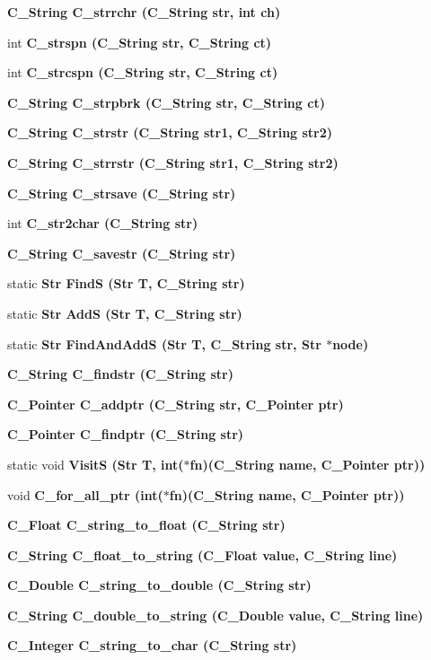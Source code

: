 \begin{CompactItemize}
\bf{C\_\-String} \bf{C\_\-strrchr} (\bf{C\_\-String} str, int ch)
\item 
int \bf{C\_\-strspn} (\bf{C\_\-String} str, \bf{C\_\-String} ct)
\item 
int \bf{C\_\-strcspn} (\bf{C\_\-String} str, \bf{C\_\-String} ct)
\item 
\bf{C\_\-String} \bf{C\_\-strpbrk} (\bf{C\_\-String} str, \bf{C\_\-String} ct)
\item 
\bf{C\_\-String} \bf{C\_\-strstr} (\bf{C\_\-String} str1, \bf{C\_\-String} str2)
\item 
\bf{C\_\-String} \bf{C\_\-strrstr} (\bf{C\_\-String} str1, \bf{C\_\-String} str2)
\item 
\bf{C\_\-String} \bf{C\_\-strsave} (\bf{C\_\-String} str)
\item 
int \bf{C\_\-str2char} (\bf{C\_\-String} str)
\item 
\bf{C\_\-String} \bf{C\_\-savestr} (\bf{C\_\-String} str)
\item 
static \bf{Str} \bf{Find\-S} (\bf{Str} T, \bf{C\_\-String} str)
\item 
static \bf{Str} \bf{Add\-S} (\bf{Str} T, \bf{C\_\-String} str)
\item 
static \bf{Str} \bf{Find\-And\-Add\-S} (\bf{Str} T, \bf{C\_\-String} str, \bf{Str} $\ast$\bf{node})
\item 
\bf{C\_\-String} \bf{C\_\-findstr} (\bf{C\_\-String} str)
\item 
\bf{C\_\-Pointer} \bf{C\_\-addptr} (\bf{C\_\-String} str, \bf{C\_\-Pointer} ptr)
\item 
\bf{C\_\-Pointer} \bf{C\_\-findptr} (\bf{C\_\-String} str)
\item 
static void \bf{Visit\-S} (\bf{Str} T, int($\ast$fn)(\bf{C\_\-String} \bf{name}, \bf{C\_\-Pointer} ptr))
\item 
void \bf{C\_\-for\_\-all\_\-ptr} (int($\ast$fn)(\bf{C\_\-String} \bf{name}, \bf{C\_\-Pointer} ptr))
\item 
\bf{C\_\-Float} \bf{C\_\-string\_\-to\_\-float} (\bf{C\_\-String} str)
\item 
\bf{C\_\-String} \bf{C\_\-float\_\-to\_\-string} (\bf{C\_\-Float} value, \bf{C\_\-String} line)
\item 
\bf{C\_\-Double} \bf{C\_\-string\_\-to\_\-double} (\bf{C\_\-String} str)
\item 
\bf{C\_\-String} \bf{C\_\-double\_\-to\_\-string} (\bf{C\_\-Double} value, \bf{C\_\-String} line)
\item 
\bf{C\_\-Integer} \bf{C\_\-string\_\-to\_\-char} (\bf{C\_\-String} str)

\end{CompactItemize}
